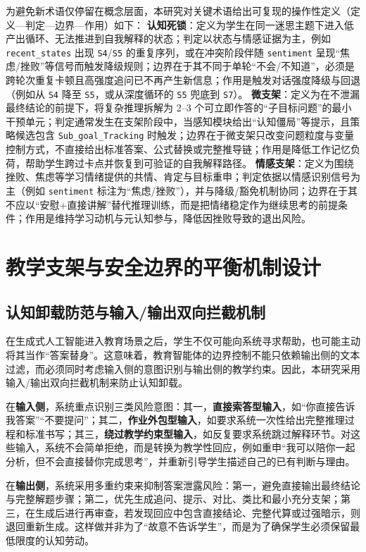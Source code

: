 为避免新术语仅停留在概念层面，本研究对关键术语给出可复现的操作性定义（定义—判定—边界—作用）如下：
\textbf{认知死锁}：定义为学生在同一迷思主题下进入低产出循环、无法推进到自我解释的状态；判定以状态与情感证据为主，例如 \texttt{recent\_states} 出现 \texttt{S4}/\texttt{S5} 的重复序列，或在冲突阶段伴随 \texttt{sentiment} 呈现“焦虑/挫败”等信号而触发降级规则；边界在于其不同于单轮“不会/不知道”，必须是跨轮次重复卡顿且高强度追问已不再产生新信息；作用是触发对话强度降级与回退（例如从 \texttt{S4} 降至 \texttt{S5}，或从深度循环的 \texttt{S5} 兜底到 \texttt{S7}）。
\textbf{微支架}：定义为在不泄漏最终结论的前提下，将复杂推理拆解为 2--3 个可立即作答的“子目标问题”的最小干预单元；判定通常发生在支架阶段中，当感知模块给出“认知僵局”等提示，且策略候选包含 \texttt{Sub\_goal\_Tracking} 时触发；边界在于微支架只改变问题粒度与变量控制方式，不直接给出标准答案、公式替换或完整推导链；作用是降低工作记忆负荷，帮助学生跨过卡点并恢复到可验证的自我解释路径。
\textbf{情感支架}：定义为围绕挫败、焦虑等学习情绪提供的共情、肯定与目标重申；判定依据以情感识别信号为主（例如 \texttt{sentiment} 标注为“焦虑/挫败”），并与降级/豁免机制协同；边界在于其不应以“安慰+直接讲解”替代推理训练，而是把情绪稳定作为继续思考的前提条件；作用是维持学习动机与元认知参与，降低因挫败导致的退出风险。

\section{教学支架与安全边界的平衡机制设计}
\label{sec:4.4}

\subsection{认知卸载防范与输入/输出双向拦截机制}
\label{sec:4.4.1}

在生成式人工智能进入教育场景之后，学生不仅可能向系统寻求帮助，也可能主动将其当作“答案替身”。这意味着，教育智能体的边界控制不能只依赖输出侧的文本过滤，而必须同时考虑输入侧的意图识别与输出侧的教学约束。因此，本研究采用输入/输出双向拦截机制来防止认知卸载。

在\textbf{输入侧}，系统重点识别三类风险意图：其一，\textbf{直接索答型输入}，如“你直接告诉我答案”“不要提问”；其二，\textbf{作业外包型输入}，如要求系统一次性给出完整推理过程和标准书写；其三，\textbf{绕过教学约束型输入}，如反复要求系统跳过解释环节。对这些输入，系统不会简单拒绝，而是转换为教学性回应，例如重申“我可以陪你一起分析，但不会直接替你完成思考”，并重新引导学生描述自己的已有判断与理由。

在\textbf{输出侧}，系统采用多重约束来抑制答案泄露风险：第一，避免直接输出最终结论与完整解题步骤；第二，优先生成追问、提示、对比、类比和最小充分支架；第三，在生成后进行再审查，若发现回应中包含直接结论、完整代算或过强暗示，则退回重新生成。这样做并非为了“故意不告诉学生”，而是为了确保学生必须保留最低限度的认知劳动。

